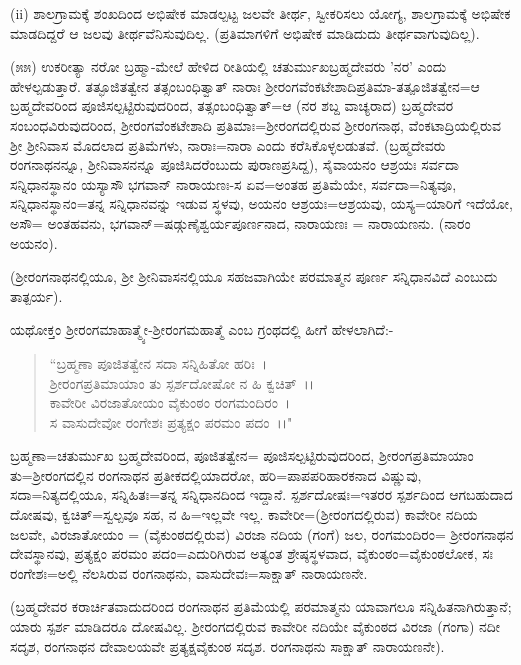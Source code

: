 (ii) ಶಾಲಗ್ರಾಮಕ್ಕೆ ಶಂಖದಿಂದ ಅಭಿಷೇಕ ಮಾಡಲ್ಪಟ್ಟ ಜಲವೇ ತೀರ್ಥ, ಸ್ವೀಕರಿಸಲು ಯೋಗ್ಯ, ಶಾಲಗ್ರಾಮಕ್ಕೆ ಅಭಿಷೇಕ ಮಾಡದಿದ್ದರೆ ಆ ಜಲವು ತೀರ್ಥವೆನಿಸುವುದಿಲ್ಲ. (ಪ್ರತಿಮಾಗಳಿಗೆ ಅಭಿಷೇಕ ಮಾಡಿದುದು ತೀರ್ಥವಾಗುವುದಿಲ್ಲ).

(೫೫) ಉಕರೀತ್ಯಾ ನರೋ ಬ್ರಹ್ಮಾ-ಮೇಲೆ ಹೇಳಿದ ರೀತಿಯಲ್ಲಿ ಚತುರ್ಮುಖಬ್ರಹ್ಮದೇವರು 'ನರ' ಎಂದು ಹೇಳಲ್ಪಡುತ್ತಾರೆ. ತತ್ಫೂಜಿತತ್ವೇನ ತತ್ಸಂಬಂಧಿತ್ವಾತ್ ನಾರಾಃ ಶ‍್ರೀರಂಗವೆಂಕಟೇಶಾದಿಪ್ರತಿಮಾ-ತತ್ಪೂಜಿತತ್ವೇನ=ಆ ಬ್ರಹ್ಮದೇವರಿಂದ ಪೂಜಿಸಲ್ಪಟ್ಟಿರುವುದರಿಂದ, ತತ್ಸಂಬಂಧಿತ್ವಾತ್=ಆ (ನರ ಶಬ್ದ ವಾಚ್ಯರಾದ) ಬ್ರಹ್ಮದೇವರ ಸಂಬಂಧವಿರುವುದರಿಂದ, ಶ‍್ರೀರಂಗವೆಂಕಟೇಶಾದಿ ಪ್ರತಿಮಾಃ=ಶ‍್ರೀರಂಗದಲ್ಲಿರುವ ಶ‍್ರೀರಂಗನಾಥ, ವೆಂಕಟಾದ್ರಿಯಲ್ಲಿರುವ ಶ‍್ರೀ ಶ‍್ರೀನಿವಾಸ ಮೊದಲಾದ ಪ್ರತಿಮೆಗಳು, ನಾರಾಃ=ನಾರಾ ಎಂದು ಕರೆಸಿಕೊಳ್ಳಲಡುತವೆ. (ಬ್ರಹ್ಮದೇವರು ರಂಗನಾಥನನ್ನೂ, ಶ‍್ರೀನಿವಾಸನನ್ನೂ ಪೂಜಿಸಿದರೆಂಬುದು ಪುರಾಣಪ್ರಸಿದ್ದ), ಸೈವಾಯನಂ ಆಶ್ರಯಃ ಸರ್ವದಾ ಸನ್ನಿಧಾನಸ್ಥಾನಂ ಯಸ್ಯಾಸೌ ಭಗವಾನ್ ನಾರಾಯಣಃ-ಸ ಏವ=ಅಂತಹ ಪ್ರತಿಮೆಯೇ, ಸರ್ವದಾ=ನಿತ್ಯವೂ, ಸನ್ನಿಧಾನಸ್ಥಾನಂ=ತನ್ನ ಸನ್ನಿಧಾನವನ್ನು ಇಡುವ ಸ್ಥಳವು, ಅಯನಂ ಆಶ್ರಯಃ=ಆಶ್ರಯವು, ಯಸ್ಯ=ಯಾರಿಗೆ ಇದೆಯೋ, ಅಸೌ= ಅಂತಹವನು, ಭಗವಾನ್=ಷಡ್ಗುಣೈಶ್ವರ್ಯಪೂರ್ಣನಾದ, ನಾರಾಯಣಃ = ನಾರಾಯಣನು. (ನಾರಂ ಅಯನಂ).

(ಶ‍್ರೀರಂಗನಾಥನಲ್ಲಿಯೂ, ಶ‍್ರೀ ಶ‍್ರೀನಿವಾಸನಲ್ಲಿಯೂ ಸಹಜವಾಗಿಯೇ ಪರಮಾತ್ಮನ ಪೂರ್ಣ ಸನ್ನಿಧಾನವಿದೆ ಎಂಬುದು ತಾತ್ಪರ್ಯ).

ಯಥೋಕ್ತಂ ಶ‍್ರೀರಂಗಮಾಹಾತ್ಮ್ಯೇ-ಶ‍್ರೀರಂಗಮಹಾತ್ಮೆ ಎಂಬ ಗ್ರಂಥದಲ್ಲಿ ಹೀಗೆ ಹೇಳಲಾಗಿದೆ:-

\begin{verse}
``ಬ್ರಹ್ಮಣಾ ಪೂಜಿತತ್ವೇನ ಸದಾ ಸನ್ನಿಹಿತೋ ಹರಿಃ~।\\ ಶ‍್ರೀರಂಗಪ್ರತಿಮಾಯಾಂ ತು ಸ್ಪರ್ಶದೋಷೋ ನ ಹಿ ಕ್ವಚಿತ್~।।\\ ಕಾವೇರೀ ವಿರಜಾತೋಯಂ ವೈಕುಂಠಂ ರಂಗಮಂದಿರಂ~।\\ ಸ ವಾಸುದೇವೋ ರಂಗೇಶಃ ಪ್ರತ್ಯಕ್ಷಂ ಪರಮಂ ಪದಂ~।।"
\end{verse}


ಬ್ರಹ್ಮಣಾ=ಚತುರ್ಮುಖ ಬ್ರಹ್ಮದೇವರಿಂದ, ಪೂಜಿತತ್ವೇನ= ಪೂಜಿಸಲ್ಪಟ್ಟಿರುವುದರಿಂದ, ಶ‍್ರೀರಂಗಪ್ರತಿಮಾಯಾಂ ತು=ಶ‍್ರೀರಂಗದಲ್ಲಿನ ರಂಗನಾಥನ ಪ್ರತೀಕದಲ್ಲಿಯಾದರೋ, ಹರಿ=ಪಾಪಪರಿಹಾರಕನಾದ ವಿಷ್ಣುವು, ಸದಾ=ನಿತ್ಯದಲ್ಲಿಯೂ, ಸನ್ನಿಹಿತಃ=ತನ್ನ ಸನ್ನಿಧಾನದಿಂದ ಇದ್ದಾನೆ. ಸ್ಪರ್ಶದೋಷಃ=ಇತರರ ಸ್ಪರ್ಶದಿಂದ ಆಗಬಹುದಾದ ದೋಷವು, ಕ್ವಚಿತ್=ಸ್ವಲ್ಪವೂ ಸಹ, ನ ಹಿ=ಇಲ್ಲವೇ ಇಲ್ಲ. ಕಾವೇರೀ=(ಶ‍್ರೀರಂಗದಲ್ಲಿರುವ) ಕಾವೇರೀ ನದಿಯ ಜಲವೇ, ವಿರಜಾತೋಯಂ = (ವೈಕುಂಠದಲ್ಲಿರುವ) ವಿರಜಾ ನದಿಯ (ಗಂಗೆ) ಜಲ, ರಂಗಮಂದಿರಂ= ಶ‍್ರೀರಂಗನಾಥನ ದೇವಸ್ಥಾನವು, ಪ್ರತ್ಯಕ್ಷಂ ಪರಮಂ ಪದಂ=ಎದುರಿಗಿರುವ ಅತ್ಯಂತ ಶ್ರೇಷ್ಠಸ್ಥಳವಾದ, ವೈಕುಂಠಂ=ವೈಕುಂಠಲೋಕ, ಸಃ ರಂಗೇಶಃ=ಅಲ್ಲಿ ನೆಲಸಿರುವ ರಂಗನಾಥನು, ವಾಸುದೇವಃ=ಸಾಕ್ಷಾತ್ ನಾರಾಯಣನೇ.

(ಬ್ರಹ್ಮದೇವರ ಕರಾರ್ಚಿತವಾದುದರಿಂದ ರಂಗನಾಥನ ಪ್ರತಿಮೆಯಲ್ಲಿ ಪರಮಾತ್ಮನು ಯಾವಾಗಲೂ ಸನ್ನಿಹಿತನಾಗಿರುತ್ತಾನೆ; ಯಾರು ಸ್ಪರ್ಶ ಮಾಡಿದರೂ ದೋಷವಿಲ್ಲ. ಶ‍್ರೀರಂಗದಲ್ಲಿರುವ ಕಾವೇರೀ ನದಿಯೇ ವೈಕುಂಠದ ವಿರಜಾ (ಗಂಗಾ) ನದೀ ಸದೃಶ, ರಂಗನಾಥನ ದೇವಾಲಯವೇ ಪ್ರತ್ಯಕ್ಷವೈಕುಂಠ ಸದೃಶ. ರಂಗನಾಥನು ಸಾಕ್ಷಾತ್ ನಾರಾಯಣನೇ).

